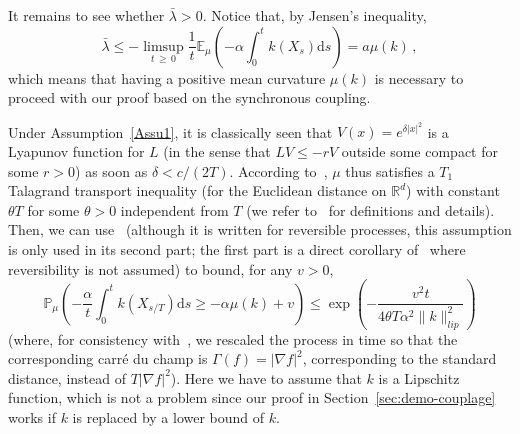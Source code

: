 \documentclass[AHL,Unicode,longabstracts,published]{cedram}
\newcommand{\R}{\mathbb R}
\newcommand{\bbP}{\mathbb P}
\newcommand{\bbE}{\mathbb E}
\newcommand{\dd}{\mathrm{d}}
\newcommand{\na}{\nabla}
\newcommand{\1}{\mathbbm{1}}
\newcommand{\R}{\mathbb R}
\begin{document}
It remains to see whether $\bar \lambda>0$. Notice that, by Jensen's inequality,
\[
\bar \lambda \leqslant - \limsup_{t\,\geqslant\,0} \frac{1}{t} \bbE_{\mu} \left( - \alpha \int_0^t k(X_s)\dd s \right) = a \mu(k)\,,
\]
which means that having a positive mean curvature $\mu(k)$ is necessary to proceed with our proof based on the synchronous coupling.

Under Assumption~\ref{Assu1}, it is classically seen that $V(x) = e^{\delta |x|^2}$ is a Lyapunov function for $L$ (in the sense that $LV \leqslant - r V$ outside some compact for some $r>0$) as soon as $\delta <c/(2T)$. According to~\cite[Theorem~2.3.]{Djellout}, $\mu$ thus satisfies a $T_1$ Talagrand transport inequality (for the Euclidean distance on $\R^d$) with constant $\theta T$ for some $\theta>0$ independent from $T$ (we refer to~\cite{Djellout} for definitions and details). Then, we can use~\cite[Corollary~2.4]{guillin2009transportation} (although it is written for reversible processes, this assumption is only used in its second part; the first part is a direct corollary of~\cite[Theorem~2.2]{guillin2009transportation} where reversibility is not assumed) to bound, for any $v > 0$,
\[
\bbP_\mu \left( - \frac\alpha{t} \int_0^t k(X_{s/T})\dd s \geqslant -\alpha \mu(k) + v \right) \leqslant \exp\left(- \frac{v^2 t }{4\theta T \alpha^2 \|k\|_{lip}^2}\right)
\]
(where, for consistency with~\cite{guillin2009transportation}, we rescaled the process in time so that the corresponding carré du champ is $\Gamma(f)=|\na f|^2$, corresponding to the standard distance, instead of $T|\na f|^2$). Here we have to assume that $k$ is a Lipschitz function, which is not a problem since our proof in Section~\ref{sec:demo-couplage} works if $k$ is replaced by a lower bound of $k$.
\end{document}
